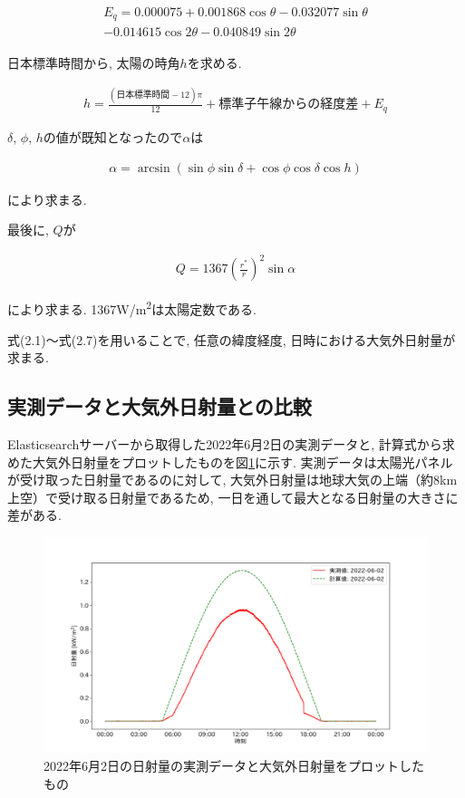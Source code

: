 \begin{eqnarray}
  \begin{split}
    E_q =  0.000075+0.001868\cos \theta-0.032077\sin \theta\\
    -0.014615\cos 2\theta-0.040849\sin 2\theta
  \end{split}
\end{eqnarray}

日本標準時間から, 太陽の時角$h$を求める.

\begin{eqnarray}
  h = \frac{(日本標準時間-12)\pi}{12}+標準子午線からの経度差+E_q
\end{eqnarray}

$\delta$, $\phi$, $h$の値が既知となったので$\alpha$は

\begin{eqnarray}
  \alpha = \arcsin (\sin \phi\sin \delta+\cos \phi\cos \delta\cos h)
\end{eqnarray}

により求まる.

最後に, $Q$が

\begin{eqnarray}
  Q = 1367(\frac{r^{*}}{r})^{2}\sin \alpha
\end{eqnarray}

により求まる. 1367\si{\watt}/\si{\metre\squared}は太陽定数である.

式(2.1)～式(2.7)を用いることで, 任意の緯度経度, 日時における大気外日射量が求まる.


\subsection{実測データと大気外日射量との比較}
Elasticsearchサーバーから取得した2022年6月2日の実測データと, 計算式から求めた大気外日射量をプロットしたものを図\ref{20220529-p1}に示す. 実測データは太陽光パネルが受け取った日射量であるのに対して, 大気外日射量は地球大気の上端（約8km上空）で受け取る日射量であるため, 一日を通して最大となる日射量の大きさに差がある.

\begin{figure}[h]
  \begin{center}
    \includegraphics[width=160mm]{sotu/figure/2/original-20220602-corr.png}
    \caption{2022年6月2日の日射量の実測データと大気外日射量をプロットしたもの}
    \label{20220529-p1}
  \end{center}
\end{figure}

